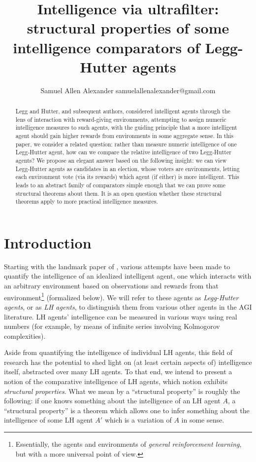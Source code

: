\documentclass[twoside,11pt]{article}
\author{\name Samuel Allen Alexander \email samuelallenalexander@gmail.com}
\title{Intelligence via ultrafilter: structural properties of some intelligence
comparators of Legg-Hutter agents}
\begin{document}
\maketitle

\begin{abstract}
    Legg and Hutter, and subsequent authors, considered intelligent agents
    through the lens of interaction with reward-giving
    environments, attempting to
    assign numeric intelligence measures to such agents, with the guiding
    principle that a more intelligent agent should gain higher rewards
    from environments in some aggregate sense.
    In this paper, we consider a related question: rather than measure
    numeric intelligence of one Legg-Hutter agent, how can we compare the
    relative intelligence
    of two Legg-Hutter agents? We propose an elegant answer based on
    the following insight:
    we can view Legg-Hutter agents as candidates in an election, whose voters are
    environments, letting each environment vote (via its rewards) which
    agent (if either) is more intelligent. This leads to an abstract
    family of comparators simple enough that we can prove
    some structural theorems about them. It is an open question whether
    these structural theorems apply to more practical intelligence measures.
\end{abstract}

\section{Introduction}

Starting with the landmark paper of \citet{hutter2007}, various
attempts \citep{hernandez, hibbard} have been
made to quantify the intelligence of an idealized intelligent agent, one which interacts
with an arbitrary environment based on observations and
rewards from that environment\footnote{Essentially, the agents and environments
of \emph{general reinforcement learning}, but with a more universal
point of view.}
(formalized
below).
We will refer to these agents as \emph{Legg-Hutter agents},
or as \emph{LH agents}, to distinguish them
from various other agents in the AGI literature.
LH agents' intelligence can be measured in
various ways using real numbers (for example, by
means of infinite series involving Kolmogorov complexities).

Aside from quantifying the intelligence of individual LH agents, this field
of research has the potential to shed light on (at least certain aspects of)
intelligence itself,
abstracted over many LH agents.
To that end, we intend to present a notion of the comparative
intelligence of LH agents, which notion exhibits
\emph{structural properties}. What we mean by
a ``structural property'' is roughly the following: if one knows something about the
intelligence of an LH agent $A$, a ``structural property'' is a theorem which allows one
to infer something about the intelligence of some LH agent $A'$ which is a variation of
$A$ in some sense.
\end{document}
